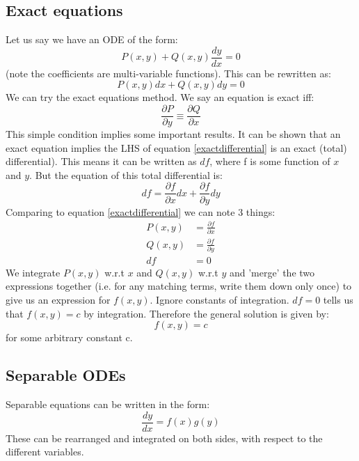 \documentclass{scrartcl}
\begin{document}
\subsection{Exact equations}
Let us say we have an ODE of the form:
\begin{equation}
P(x, y) + Q(x, y)\frac{dy}{dx} = 0
\end{equation}
(note the coefficients are multi-variable functions). This can be rewritten as:
\begin{equation} \label{exactdifferential}
P(x, y) dx + Q(x, y) dy = 0
\end{equation}
We can try the exact equations method. We say an equation is exact iff:
\begin{equation}
\frac{\partial P}{\partial y} \equiv \frac{\partial Q}{\partial x} 
\end{equation}
This simple condition implies some important results. It can be shown that an exact equation implies the LHS of equation \ref{exactdifferential} is an exact (total) differential). This means it can be written as $ df $, where f is some function of $ x $ and $ y $. But the equation of this total differential is:
\begin{equation}
df = \frac{\partial f}{\partial x}dx + \frac{\partial f}{\partial y}dy
\end{equation}
Comparing to equation \ref{exactdifferential} we can note 3 things:
\begin{equation}
\begin{split}
P(x, y) & = \frac{\partial f}{\partial x} \\
Q(x, y) & = \frac{\partial f}{\partial y} \\
df & = 0
\end{split}
\end{equation}
We integrate $ P(x, y) $ w.r.t $ x $ and $ Q(x, y) $ w.r.t $ y $ and 'merge' the two expressions together (i.e. for any matching terms, write them down only once) to give us an expression for $ f(x, y) $. Ignore constants of integration. $ df = 0 $ tells us that $ f(x, y) = c $ by integration. Therefore the general solution is given by:
\begin{equation}
f(x, y) = c
\end{equation}
for some arbitrary constant c.

\subsection{Separable ODEs}
Separable equations can be written in the form:
\begin{equation}
\frac{dy}{dx} = f(x)g(y)
\end{equation}
These can be rearranged and integrated on both sides, with respect to the different variables.
\end{document}
